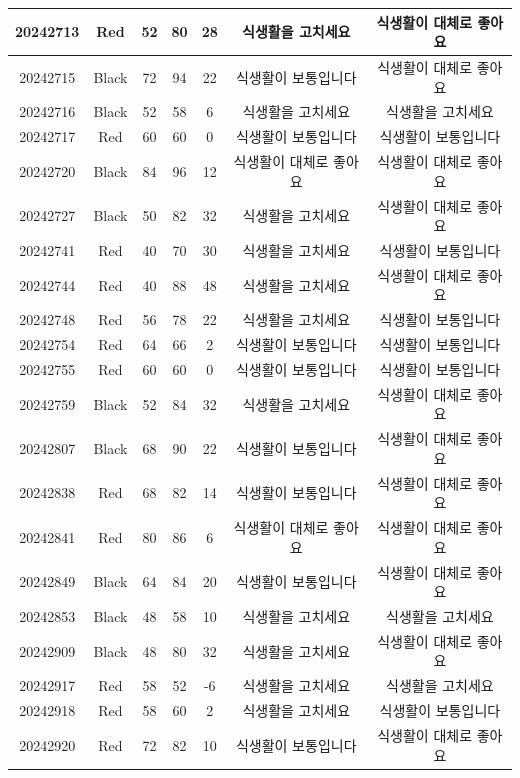 \documentclass[
]{book}
\begin{document}
\begin{tabular}{c|c|c|c|c|c|c}
20242713 & Red & 52 & 80 & 28 & 식생활을 고치세요 & 식생활이 대체로 좋아요\\
\hline
20242715 & Black & 72 & 94 & 22 & 식생활이 보통입니다 & 식생활이 대체로 좋아요\\
\hline
20242716 & Black & 52 & 58 & 6 & 식생활을 고치세요 & 식생활을 고치세요\\
\hline
20242717 & Red & 60 & 60 & 0 & 식생활이 보통입니다 & 식생활이 보통입니다\\
\hline
20242720 & Black & 84 & 96 & 12 & 식생활이 대체로 좋아요 & 식생활이 대체로 좋아요\\
\hline
20242727 & Black & 50 & 82 & 32 & 식생활을 고치세요 & 식생활이 대체로 좋아요\\
\hline
20242741 & Red & 40 & 70 & 30 & 식생활을 고치세요 & 식생활이 보통입니다\\
\hline
20242744 & Red & 40 & 88 & 48 & 식생활을 고치세요 & 식생활이 대체로 좋아요\\
\hline
20242748 & Red & 56 & 78 & 22 & 식생활을 고치세요 & 식생활이 보통입니다\\
\hline
20242754 & Red & 64 & 66 & 2 & 식생활이 보통입니다 & 식생활이 보통입니다\\
\hline
20242755 & Red & 60 & 60 & 0 & 식생활이 보통입니다 & 식생활이 보통입니다\\
\hline
20242759 & Black & 52 & 84 & 32 & 식생활을 고치세요 & 식생활이 대체로 좋아요\\
\hline
20242807 & Black & 68 & 90 & 22 & 식생활이 보통입니다 & 식생활이 대체로 좋아요\\
\hline
20242838 & Red & 68 & 82 & 14 & 식생활이 보통입니다 & 식생활이 대체로 좋아요\\
\hline
20242841 & Red & 80 & 86 & 6 & 식생활이 대체로 좋아요 & 식생활이 대체로 좋아요\\
\hline
20242849 & Black & 64 & 84 & 20 & 식생활이 보통입니다 & 식생활이 대체로 좋아요\\
\hline
20242853 & Black & 48 & 58 & 10 & 식생활을 고치세요 & 식생활을 고치세요\\
\hline
20242909 & Black & 48 & 80 & 32 & 식생활을 고치세요 & 식생활이 대체로 좋아요\\
\hline
20242917 & Red & 58 & 52 & -6 & 식생활을 고치세요 & 식생활을 고치세요\\
\hline
20242918 & Red & 58 & 60 & 2 & 식생활을 고치세요 & 식생활이 보통입니다\\
\hline
20242920 & Red & 72 & 82 & 10 & 식생활이 보통입니다 & 식생활이 대체로 좋아요\\

\end{tabular}
\end{document}
